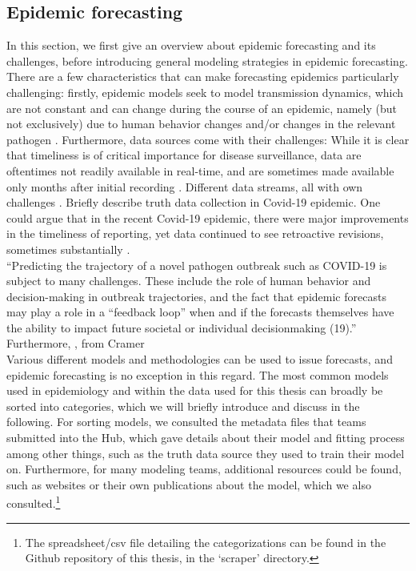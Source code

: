 \subsection{Epidemic forecasting}
In this section, we first give an overview about epidemic forecasting and its challenges, before introducing general modeling strategies in epidemic forecasting.\\
There are a few characteristics that can make forecasting epidemics particularly challenging: firstly, epidemic models seek to model transmission dynamics, which are not constant and can change during the course of an epidemic, namely (but not exclusively) due to human behavior changes and/or changes in the relevant pathogen \citep{moran_epidemic_2016}. Furthermore, data sources come with their challenges: While it is clear that timeliness is of critical importance for disease surveillance, data are oftentimes not readily available in real-time, and are sometimes made available only months after initial recording \cite{jajosky_evaluation_2004} . Different data streams, all with own challenges \cite{moran_epidemic_2016}. Briefly describe truth data collection in Covid-19 epidemic. One could argue that in the recent Covid-19 epidemic, there were major improvements in the timeliness of reporting, yet data continued to see retroactive revisions, sometimes substantially . \\
``Predicting the trajectory of a novel pathogen outbreak such
as COVID-19 is subject to many challenges. These include the
role of human behavior and decision-making in outbreak
trajectories, and the fact that epidemic forecasts may play a
role in a “feedback loop” when and if the forecasts themselves
have the ability to impact future societal or individual decisionmaking
(19).''
Furthermore,  \cite{moran_epidemic_2016}, from Cramer \medskip\\
Various different models and methodologies can be used to issue forecasts, and epidemic forecasting is no exception in this regard. The most common models used in epidemiology and within the data used for this thesis can broadly be sorted into categories, which we will briefly introduce and discuss in the following. For sorting models, we consulted the metadata files that teams submitted into the Hub, which gave details about their model and fitting process among other things, such as the truth data source they used to train their model on. Furthermore, for many modeling teams, additional resources could be found, such as websites or their own publications about the model, which we also consulted.\footnote{The spreadsheet/csv file detailing the categorizations can be found in the Github repository of this thesis, in the `scraper' directory.} %
